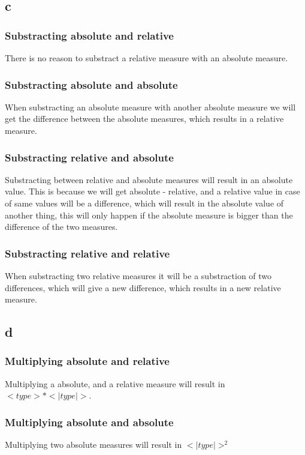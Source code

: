 \documentclass[10pt,a4paper]{article}      %
\begin{document}
\subsection*{c}
\subsubsection*{Substracting absolute and relative}
There is no reason to substract a relative measure with an absolute measure.

\subsubsection*{Substracting absolute and absolute}
When substracting an absolute measure with another absolute measure we will get the difference between the absolute measures, which results in a relative measure.

\subsubsection*{Substracting relative and absolute}
Substracting between relative and absolute measures will result in an absolute value. This is because we will get absolute - relative, and a relative value in case of same values will be a difference, which will result in the absolute value of another thing, this will only happen if the absolute measure is bigger than the difference of the two measures.

\subsubsection*{Substracting relative and relative}
When substracting two relative measures it will be a substraction of two differences, which will give a new difference, which results in a new relative measure.

\subsection*{d}
\subsubsection*{Multiplying absolute and relative}
Multiplying a absolute, and a relative measure will result in $<type>*<|type|>$.

\subsubsection*{Multiplying absolute and absolute}
Multiplying two absolute measures will result in $<|type|>^2$
\end{document}
